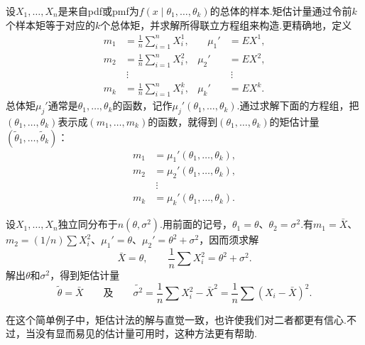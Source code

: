 设$X_1,\ldots,X_n$是来自pdf或pmf为$f(x\mid\theta_1,\ldots,\theta_k)$的总体的样本.矩估计量通过令前$k$个样本矩等于对应的$k$个总体矩，并求解所得联立方程组来构造.更精确地，定义
\begin{equation}\label{eq:7.2.1}
\begin{aligned}
m_1&=\frac1n\sum_{i=1}^nX_i^1,&\quad\mu_1'&=EX^1,\\
m_2&=\frac1n\sum_{i=1}^nX_i^2,&\mu_2'&=EX^2,\\
&\ \vdots&&\ \vdots\\
m_k&=\frac1n\sum_{i=1}^nX_i^k,&\mu_k'&=EX^k.
\end{aligned}
\end{equation}
总体矩$\mu_j'$通常是$\theta_1,\ldots,\theta_k$的函数，记作$\mu_j'(\theta_1,\ldots,\theta_k)$.通过求解下面的方程组，把$(\theta_1,\ldots,\theta_k)$表示成$(m_1,\ldots,m_k)$的函数，就得到$(\theta_1,\ldots,\theta_k)$的矩估计量$(\widetilde\theta_1,\ldots,\widetilde\theta_k)$：
\begin{equation}\label{eq:7.2.2}
\begin{aligned}
m_1&=\mu_1'(\theta_1,\ldots,\theta_k),\\
m_2&=\mu_2'(\theta_1,\ldots,\theta_k),\\
&\ \vdots\\
m_k&=\mu_k'(\theta_1,\ldots,\theta_k).
\end{aligned}
\end{equation}
\begin{example}[正态分布的矩估计]\label{ex:7.2.1}
设$X_1,\ldots,X_n$独立同分布于$n(\theta,\sigma^2)$.用前面的记号，$\theta_1=\theta$、$\theta_2=\sigma^2$.有$m_1=\bar X$、$m_2=(1/n)\sum X_i^2$、$\mu_1'=\theta$、$\mu_2'=\theta^2+\sigma^2$，因而须求解
$$\bar X=\theta,\qquad\frac1n\sum X_i^2=\theta^2+\sigma^2.$$
解出$\theta$和$\sigma^2$，得到矩估计量
$$\widetilde\theta=\bar X\qquad\text{及}\qquad\widetilde{\sigma^2}=\frac1n\sum X_i^2-\bar X^2=\frac1n\sum(X_i-\bar X)^2.$$
\end{example}
在这个简单例子中，矩估计法的解与直觉一致，也许使我们对二者都更有信心.不过，当没有显而易见的估计量可用时，这种方法更有帮助.
